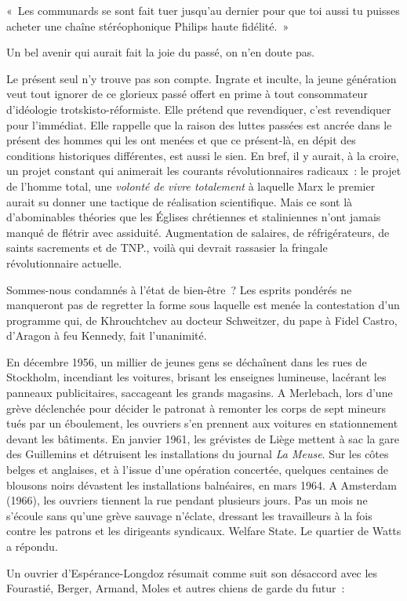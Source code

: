 \documentclass[french,twoside]{book} %
\newenvironment{quoteblock}%
  {\begin{quoting}}
  {\end{quoting}}
\newenvironment{quotebar}{%
    \def\FrameCommand{{\color{rubric!10!}\vrule width 0.5em} \hspace{0.9em}}%
    \def\OuterFrameSep{\itemsep} %
    \MakeFramed {\advance\hsize-\width \FrameRestore}
  }%
  {%
    \endMakeFramed
  }
\renewenvironment{quoteblock}%
  {%
    \savenotes
    \setstretch{0.9}
    \normalfont
    \begin{quotebar}
  }
  {%
    \end{quotebar}
    \spewnotes
  }
\begin{document}
\begin{quoteblock}
\noindent « Les communards se sont fait tuer jusqu’au dernier pour que toi aussi tu puisses acheter une chaîne stéréophonique Philips haute fidélité. »\end{quoteblock}

\noindent Un bel avenir qui aurait fait la joie du passé, on n’en doute pas.\par
Le présent seul n’y trouve pas son compte. Ingrate et inculte, la jeune génération veut tout ignorer de ce glorieux passé offert en prime à tout consommateur d’idéologie trotskisto-réformiste. Elle prétend que revendiquer, c’est revendiquer pour l’immédiat. Elle rappelle que la raison des luttes passées est ancrée dans le présent des hommes qui les ont menées et que ce présent-là, en dépit des conditions historiques différentes, est aussi le sien. En bref, il y aurait, à la croire, un projet constant qui animerait les courants révolutionnaires radicaux : le projet de l’homme total, une \emph{volonté de vivre totalement} à laquelle Marx le premier aurait su donner une tactique de réalisation scientifique. Mais ce sont là d’abominables théories que les Églises chrétiennes et staliniennes n’ont jamais manqué de flétrir avec assiduité. Augmentation de salaires, de réfrigérateurs, de saints sacrements et de TNP., voilà qui devrait rassasier la fringale révolutionnaire actuelle.\par
Sommes-nous condamnés à l’état de bien-être ? Les esprits pondérés ne manqueront pas de regretter la forme sous laquelle est menée la contestation d’un programme qui, de Khrouchtchev au docteur Schweitzer, du pape à Fidel Castro, d’Aragon à feu Kennedy, fait l’unanimité.\par
En décembre 1956, un millier de jeunes gens se déchaînent dans les rues de Stockholm, incendiant les voitures, brisant les enseignes lumineuse, lacérant les panneaux publicitaires, saccageant les grands magasins. A Merlebach, lors d’une grève déclenchée pour décider le patronat à remonter les corps de sept mineurs tués par un éboulement, les ouvriers s’en prennent aux voitures en stationnement devant les bâtiments. En janvier 1961, les grévistes de Liège mettent à sac la gare des Guillemins et détruisent les installations du journal \emph{La Meuse}. Sur les côtes belges et anglaises, et à l’issue d’une opération concertée, quelques centaines de blousons noirs dévastent les installations balnéaires, en mars 1964. A Amsterdam (1966), les ouvriers tiennent la rue pendant plusieurs jours. Pas un mois ne s’écoule sans qu’une grève sauvage n’éclate, dressant les travailleurs à la fois contre les patrons et les dirigeants syndicaux. Welfare State. Le quartier de Watts a répondu.\par
Un ouvrier d’Espérance-Longdoz résumait comme suit son désaccord avec les Fourastié, Berger, Armand, Moles et autres chiens de garde du futur :\par
\end{document}
